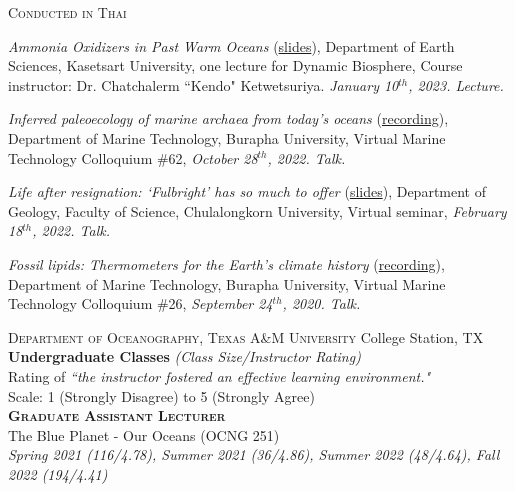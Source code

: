 \documentclass[10pt, letter]{article}
\newcommand{\margintext}[1]{\marginnote{\normalsize\textbf #1 |}}
\begin{document}
\textsc{Conducted in Thai}
\begin{etaremune}
\item \textit{Ammonia Oxidizers in Past Warm Oceans} (\href{https://tamucs-my.sharepoint.com/:b:/g/personal/rrattan_tamu_edu/ESdkQzE0k-xNufbKOW7oMxwBUtcPdXOOMauWxMsfEqFgkA?e=Xk2nDl}{slides}), Department of Earth Sciences, Kasetsart University, one lecture for Dynamic Biosphere, Course instructor: Dr. Chatchalerm ``Kendo" Ketwetsuriya. \textit{January 10$^{th}$, 2023. Lecture.}

\item \textit{Inferred paleoecology of marine archaea from today's oceans} (\href{https://fb.watch/grZcLZQSbV/}{recording}), Department of Marine Technology, Burapha University, Virtual Marine Technology Colloquium \#62, \textit{October 28$^{th}$, 2022. Talk.}

\item \textit{Life after resignation: `Fulbright' has so much to offer} (\href{https://www.canva.com/design/DAE4hfYUXJk/3E9PACt31gAkqAKfjnURkg/edit?utm_content=DAE4hfYUXJk&utm_campaign=designshare&utm_medium=link2&utm_source=sharebutton}{slides}), Department of Geology, Faculty of Science, Chulalongkorn University, Virtual seminar, \textit{February 18$^{th}$, 2022. Talk.}

\item \textit{Fossil lipids: Thermometers for the Earth's climate history} (\href{https://www.facebook.com/watch/?v=405982837057621}{recording}), Department of Marine Technology, Burapha University, Virtual Marine Technology Colloquium \#26, \textit{September 24$^{th}$, 2020. Talk.}

\end{etaremune}

\bigskip
\margintext{Teaching}
\textsc{Department of Oceanography, Texas A\&M University} \hfill College Station, TX \\
\textbf{Undergraduate Classes} \textit{(Class Size/Instructor Rating)} \\
\footnotesize 
Rating of \textit{``the instructor fostered an effective learning environment."}\\
Scale: 1 (Strongly Disagree) to 5 (Strongly Agree) \\

\normalsize
\textbf{\textsc{Graduate Assistant Lecturer}} \\
The Blue Planet - Our Oceans (OCNG 251) \\
\textit{Spring 2021 (116/4.78), Summer 2021 (36/4.86), Summer 2022 (48/4.64), Fall 2022 (194/4.41)}
\end{document}
